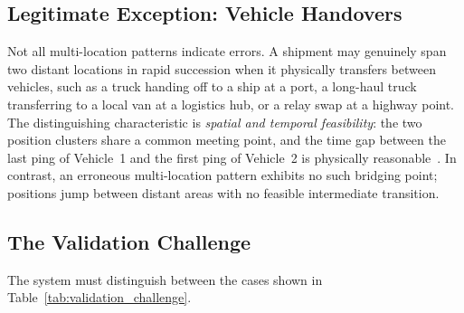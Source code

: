 \subsection{Legitimate Exception: Vehicle Handovers}
Not all multi-location patterns indicate errors. A shipment may genuinely span two distant locations in rapid succession when it physically transfers between vehicles, such as a truck handing off to a ship at a port, a long-haul truck transferring to a local van at a logistics hub, or a relay swap at a highway point. The distinguishing characteristic is \textit{spatial and temporal feasibility}: the two position clusters share a common meeting point, and the time gap between the last ping of Vehicle~1 and the first ping of Vehicle~2 is physically reasonable~\cite{dabiri2018cnn, erdelic2020segmentation}. In contrast, an erroneous multi-location pattern exhibits no such bridging point; positions jump between distant areas with no feasible intermediate transition.

\subsection{The Validation Challenge}
The system must distinguish between the cases shown in Table~\ref{tab:validation_challenge}.

